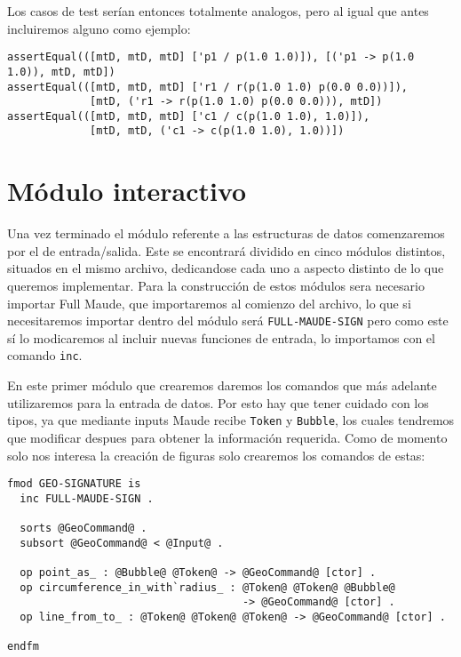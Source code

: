 Los casos de test serían entonces totalmente analogos, pero al igual que antes incluiremos alguno como ejemplo:

{\codesize
\begin{verbatim}
assertEqual(([mtD, mtD, mtD] ['p1 / p(1.0 1.0)]), [('p1 -> p(1.0 1.0)), mtD, mtD])
assertEqual(([mtD, mtD, mtD] ['r1 / r(p(1.0 1.0) p(0.0 0.0))]),
             [mtD, ('r1 -> r(p(1.0 1.0) p(0.0 0.0))), mtD])
assertEqual(([mtD, mtD, mtD] ['c1 / c(p(1.0 1.0), 1.0)]), 
             [mtD, mtD, ('c1 -> c(p(1.0 1.0), 1.0))])
\end{verbatim}
}

\section{Módulo interactivo}

Una vez terminado el módulo referente a las estructuras de datos comenzaremos por el de entrada/salida. Este se encontrará dividido en cinco módulos distintos, situados en el mismo archivo, dedicandose cada uno a aspecto distinto de lo que queremos implementar. Para la construcción de estos módulos sera necesario importar Full Maude, que importaremos al comienzo del archivo, lo que si necesitaremos importar dentro del módulo será \verb"FULL-MAUDE-SIGN" pero como este sí lo modicaremos al incluir nuevas funciones de entrada, lo importamos con el comando \verb"inc". \par

En este primer módulo que crearemos daremos los comandos que más adelante utilizaremos para la entrada de datos. Por esto hay que tener cuidado con los tipos, ya que mediante inputs Maude recibe \verb"Token" y \verb"Bubble",
los cuales tendremos que modificar despues para obtener la información requerida. Como de momento solo nos interesa la creación de figuras solo crearemos los comandos de estas:\par

{\codesize
\begin{verbatim}
fmod GEO-SIGNATURE is
  inc FULL-MAUDE-SIGN .

  sorts @GeoCommand@ .
  subsort @GeoCommand@ < @Input@ .

  op point_as_ : @Bubble@ @Token@ -> @GeoCommand@ [ctor] .
  op circumference_in_with`radius_ : @Token@ @Token@ @Bubble@ 
                                     -> @GeoCommand@ [ctor] .
  op line_from_to_ : @Token@ @Token@ @Token@ -> @GeoCommand@ [ctor] .

endfm
\end{verbatim}
}

